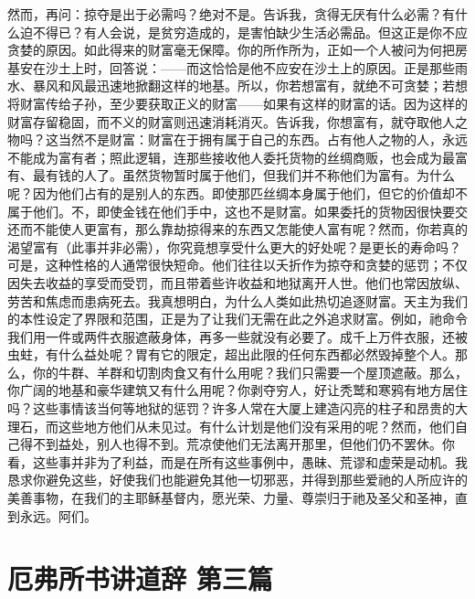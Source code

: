 然而，再问：掠夺是出于必需吗？绝对不是。告诉我，贪得无厌有什么必需？有什么迫不得已？有人会说，是贫穷造成的，是害怕缺少生活必需品。但这正是你不应贪婪的原因。如此得来的财富毫无保障。你的所作所为，正如一个人被问为何把房基安在沙土上时，回答说：——而这恰恰是他不应安在沙土上的原因。正是那些雨水、暴风和风最迅速地掀翻这样的地基。所以，你若想富有，就绝不可贪婪；若想将财富传给子孙，至少要获取正义的财富——如果有这样的财富的话。因为这样的财富存留稳固，而不义的财富则迅速消耗消灭。告诉我，你想富有，就夺取他人之物吗？这当然不是财富：财富在于拥有属于自己的东西。占有他人之物的人，永远不能成为富有者；照此逻辑，连那些接收他人委托货物的丝绸商贩，也会成为最富有、最有钱的人了。虽然货物暂时属于他们，但我们并不称他们为富有。为什么呢？因为他们占有的是别人的东西。即使那匹丝绸本身属于他们，但它的价值却不属于他们。不，即使金钱在他们手中，这也不是财富。如果委托的货物因很快要交还而不能使人更富有，那么靠劫掠得来的东西又怎能使人富有呢？然而，你若真的渴望富有（此事并非必需），你究竟想享受什么更大的好处呢？是更长的寿命吗？可是，这种性格的人通常很快短命。他们往往以夭折作为掠夺和贪婪的惩罚；不仅因失去收益的享受而受罚，而且带着些许收益和地狱离开人世。他们也常因放纵、劳苦和焦虑而患病死去。我真想明白，为什么人类如此热切追逐财富。天主为我们的本性设定了界限和范围，正是为了让我们无需在此之外追求财富。例如，祂命令我们用一件或两件衣服遮蔽身体，再多一些就没有必要了。成千上万件衣服，还被虫蛀，有什么益处呢？胃有它的限定，超出此限的任何东西都必然毁掉整个人。那么，你的牛群、羊群和切割肉食又有什么用呢？我们只需要一个屋顶遮蔽。那么，你广阔的地基和豪华建筑又有什么用呢？你剥夺穷人，好让秃鹫和寒鸦有地方居住吗？这些事情该当何等地狱的惩罚？许多人常在大厦上建造闪亮的柱子和昂贵的大理石，而这些地方他们从未见过。有什么计划是他们没有采用的呢？然而，他们自己得不到益处，别人也得不到。荒凉使他们无法离开那里，但他们仍不罢休。你看，这些事并非为了利益，而是在所有这些事例中，愚昧、荒谬和虚荣是动机。我恳求你避免这些，好使我们也能避免其他一切邪恶，并得到那些爱祂的人所应许的美善事物，在我们的主耶稣基督内，愿光荣、力量、尊崇归于祂及圣父和圣神，直到永远。阿们。\par



\section{厄弗所书讲道辞 第三篇}

